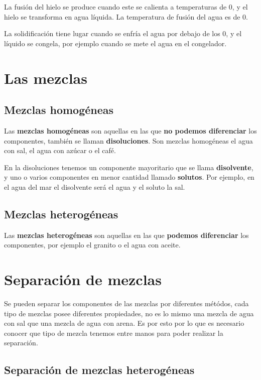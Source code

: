 La fusión del hielo se produce cuando este se calienta a temperaturas de 0\textdegree , y el hielo se transforma en agua líquida. La temperatura de fusión del agua es de 0\textdegree .

La solidificación tiene lugar cuando se enfría el agua por debajo de los 0\textdegree , y el líquido se congela, por ejemplo cuando se mete el agua en el congelador.

\section{Las mezclas}

\subsection{Mezclas homogéneas}
Las \textbf{mezclas homogéneas} son aquellas en las que \textbf{no podemos diferenciar} los componentes, también se llaman \textbf{disoluciones}. Son mezclas homogéneas el agua con sal, el agua con azúcar o el café.

 En la disoluciones tenemos un componente mayoritario que se llama \textbf{disolvente}, y uno o varios componentes en menor cantidad llamado \textbf{solutos}. Por ejemplo, en el agua del mar el disolvente será el agua y el soluto la sal.

\subsection{Mezclas heterogéneas}

Las \textbf{mezclas heterogéneas} son aquellas en las que \textbf{podemos diferenciar} los componentes, por ejemplo el granito o el agua con aceite.



\section{Separación de mezclas}

Se pueden separar los componentes de las mezclas por diferentes métódos, cada tipo de mezclas posee diferentes propiedades, no es lo mismo una mezcla de agua con sal que una mezcla de agua con arena. Es por esto por lo que es necesario conocer que tipo de mezcla tenemos entre manos para poder realizar la separación.

\subsection{Separación de mezclas heterogéneas}

